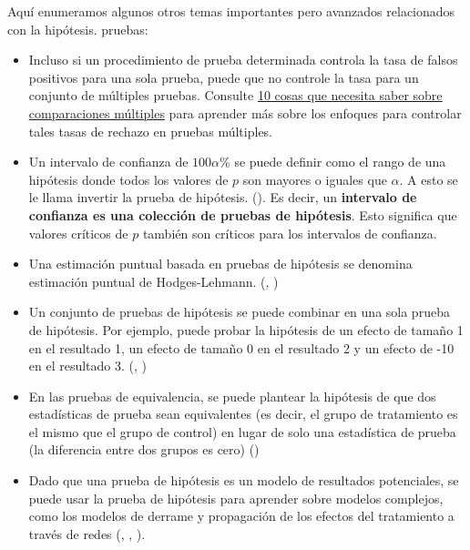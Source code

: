 \documentclass[
]{article}
\begin{document}
Aquí enumeramos algunos otros temas importantes pero avanzados relacionados con la hipótesis.
pruebas:

\begin{itemize}
\item
  Incluso si un procedimiento de prueba determinada controla la tasa de falsos positivos para una sola prueba, puede que no controle la tasa para un conjunto de múltiples pruebas. Consulte \href{https://egap.org/resource/10-things-to-know-about-multiple-comparisons}{10 cosas que necesita saber sobre comparaciones múltiples} para aprender más sobre los enfoques para controlar tales tasas de rechazo en pruebas múltiples.
\item
  Un intervalo de confianza de \(100\alpha\)\% se puede definir como el rango de una hipótesis donde todos los valores de \(p\) son mayores o iguales que \(\alpha\). A esto se le llama invertir la prueba de hipótesis. (\textcite{rosenbaum2010design}). Es decir, un \textbf{intervalo de confianza es una colección de pruebas de hipótesis}. Esto significa que valores críticos de \(p\) también son críticos para los intervalos de confianza.
\item
  Una estimación puntual basada en pruebas de hipótesis se denomina estimación puntual de Hodges-Lehmann. (\textcite{rosenbaum1993hlp}, \textcite{hodges1963elb})
\item
  Un conjunto de pruebas de hipótesis se puede combinar en una sola prueba de hipótesis. Por ejemplo, puede probar la hipótesis de un efecto de tamaño 1 en el resultado 1, un efecto de tamaño 0 en el resultado 2 y un efecto de -10 en el resultado 3. (\textcite{hansen:bowers:2008}, \textcite{caughey2017nonparametric})
\item
  En las pruebas de equivalencia, se puede plantear la hipótesis de que dos estadísticas de prueba sean equivalentes (es decir, el grupo de tratamiento es el mismo que el grupo de control) en lugar de solo una estadística de prueba (la diferencia entre dos grupos es cero) (\textcite{hartman2018equivalence})
\item
  Dado que una prueba de hipótesis es un modelo de resultados potenciales, se puede usar la prueba de hipótesis para aprender sobre modelos complejos, como los modelos de derrame y propagación de los efectos del tratamiento a través de redes (\textcite{bowers2013reasoning}, \textcite{bowers2016research}, \textcite{bowers2018models}).
\end{itemize}

\printbibliography[title=Referencias]
\end{document}

